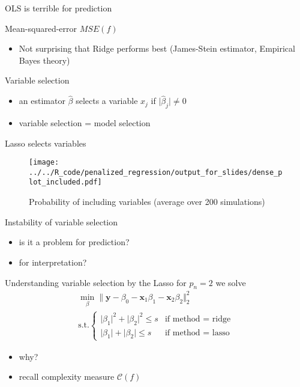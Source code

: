 \documentclass[xcolor=dvipsnames]{beamer}
\begin{document}
\begin{frame}{OLS is terrible for prediction}
\begin{table}
  
  \caption{Mean-squared-error $MSE(f)$}
\end{table}
\begin{itemize}
  \item Not surprising that Ridge performs best (James-Stein estimator, Empirical Bayes theory)
\end{itemize}
\end{frame}


\begin{frame}{Variable selection}
\begin{itemize}
  \item an estimator $\hat{\beta}$ selects a variable $x_j$ if $\lvert \hat{\beta}_j \rvert \neq 0$
  \item variable selection = model selection
\end{itemize}
\end{frame}


\begin{frame}{Lasso selects variables}
\begin{figure}
  \texttt{[image: ../../R\_code/penalized\_regression/output\_for\_slides/dense\_plot\_included.pdf]}
   \caption{Probability of including variables (average over 200 simulations)}
\end{figure}
\end{frame}


\begin{frame}{Instability of variable selection}
\begin{itemize}
  \item is it a problem for prediction?
  \item for interpretation?
\end{itemize}
\end{frame}


\begin{frame}{Understanding variable selection by the Lasso}
for $p_n = 2$ we solve 
\begin{align*}
  \min_{\beta} \lVert \mathbf{y} - \beta_0 - \mathbf{x}_1\beta_1 - \mathbf{x}_2\beta_2 \Vert_2^2
  \\
  \text{s.t.} \begin{cases}
    \lvert\beta_1\rvert^2 + \lvert \beta_2\rvert^2 \leq s & \text{if method = ridge}
  \\
    \lvert \beta_1\vert + \lvert \beta_2 \rvert \leq s & \text{if method = lasso}
  \end{cases}
\end{align*}
\begin{itemize}[<+->]
  \item why?
  \item recall complexity measure $\mathcal{C}(f)$
\end{itemize}
\end{frame}
\end{document}
